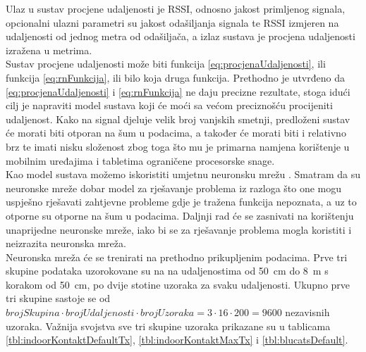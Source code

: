 Ulaz u sustav procjene udaljenosti je RSSI, odnosno jakost primljenog signala, opcionalni ulazni parametri su jakost odašiljanja signala te RSSI izmjeren na udaljenosti od jednog metra od odašiljača, a izlaz sustava je procjena udaljenosti izražena u metrima.
\\
Sustav procjene udaljenosti može biti funkcija \eqref{eq:procjenaUdaljenosti}, ili funkcija \eqref{eq:rnFunkcija}, ili bilo koja druga funkcija. 
Prethodno je utvrđeno da \eqref{eq:procjenaUdaljenosti} i \eqref{eq:rnFunkcija} ne daju precizne rezultate, stoga idući cilj je napraviti model sustava koji će moći sa većom preciznošću procijeniti udaljenost. 
Kako na signal djeluje velik broj vanjskih smetnji, predloženi sustav će morati biti otporan na šum u podacima, a također će morati biti i relativno brz te imati nisku složenost zbog toga što mu je primarna namjena korištenje u mobilnim uređajima i tabletima ograničene procesorske snage. 
\\

Kao model sustava možemo iskoristiti umjetnu neuronsku mrežu .  
Smatram da su neuronske mreže dobar model za rješavanje problema iz razloga što one mogu uspješno rješavati zahtjevne probleme gdje je tražena funkcija nepoznata, a uz to otporne su otporne na šum u podacima. 
Daljnji rad će se zasnivati na korištenju unaprijedne neuronske mreže, iako bi se za rješavanje problema mogla koristiti i neizrazita neuronska mreža.
\\

Neuronska mreža će se trenirati na prethodno prikupljenim podacima. 
Prve tri skupine podataka uzorokovane su na na udaljenostima od \SI{50}{cm} do \SI{8}{m} s korakom od \SI{50}{cm}, po dvije stotine uzoraka za svaku udaljenosti. 
Ukupno prve tri skupine sastoje se od $brojSkupina \cdot brojUdaljenosti \cdot brojUzoraka = 3 \cdot 16 \cdot 200 = 9600$ nezavisnih uzoraka. 
Važnija svojstva sve tri skupine uzoraka prikazane su u tablicama \ref{tbl:indoorKontaktDefaultTx}, \ref{tbl:indoorKontaktMaxTx} i \ref{tbl:blucatsDefault}.

